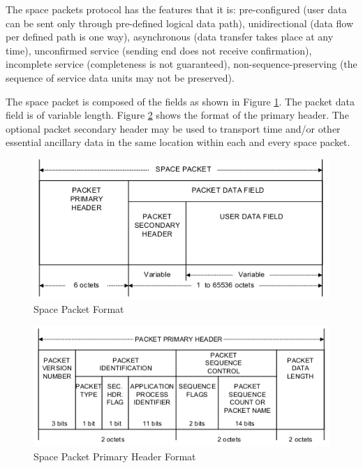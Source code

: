 The space packets protocol has the features that it is: pre-configured (user data can be sent only through pre-defined logical data path), unidirectional (data flow per defined path is one way), asynchronous (data transfer takes place at any time), unconfirmed service (sending end does not receive confirmation), incomplete service (completeness is not guaranteed), non-sequence-preserving (the sequence of service data units may not be preserved).

The space packet is composed of the fields as shown in Figure \ref{fig:Space Packet Format}. The packet data field is of variable length. Figure \ref{fig:Space Packet Primary Header Format} shows the format of the primary header. The optional packet secondary header may be used to transport time and/or other essential ancillary data in the same location within each and every space packet.

\begin{figure}[h]
\centering\includegraphics[scale=0.6]{fig/space_packet_format}
\caption{Space Packet Format}
\label{fig:Space Packet Format}
\end{figure}

\begin{figure}[h]
\centering\includegraphics[scale=0.6]{fig/space_packet_primary_header_format}
\caption{Space Packet Primary Header Format}
\label{fig:Space Packet Primary Header Format}
\end{figure}

